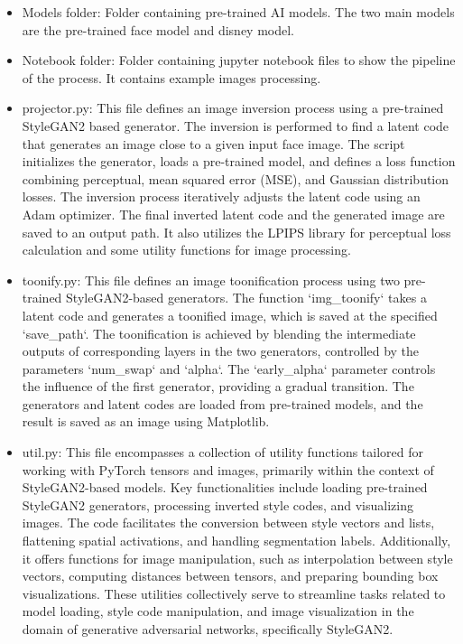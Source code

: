 \documentclass[conference]{IEEEtran}
\begin{document}
\begin{itemize}
                \vspace{3mm}
                \item Models folder: Folder containing pre-trained AI models. The two main models are the pre-trained face model and disney model.\\
                \item Notebook folder: Folder containing jupyter notebook files to show the pipeline of the process. It contains example images processing.\\
                \vspace{3mm}
                \item projector.py: This file defines an image inversion process using a pre-trained StyleGAN2 based generator. The inversion is performed to find a latent code that generates an image close to a given input face image. The script initializes the generator, loads a pre-trained model, and defines a loss function combining perceptual, mean squared error (MSE), and Gaussian distribution losses. The inversion process iteratively adjusts the latent code using an Adam optimizer. The final inverted latent code and the generated image are saved to an output path. It also utilizes the LPIPS library for perceptual loss calculation and some utility functions for image processing. \\
                \vspace{3mm}
                \item toonify.py: This file defines an image toonification process using two pre-trained StyleGAN2-based generators. The function `img\_toonify` takes a latent code and generates a toonified image, which is saved at the specified `save\_path`. The toonification is achieved by blending the intermediate outputs of corresponding layers in the two generators, controlled by the parameters `num\_swap` and `alpha`. The `early\_alpha` parameter controls the influence of the first generator, providing a gradual transition. The generators and latent codes are loaded from pre-trained models, and the result is saved as an image using Matplotlib.\\
                \vspace{3mm}
                \item util.py: This file encompasses a collection of utility functions tailored for working with PyTorch tensors and images, primarily within the context of StyleGAN2-based models. Key functionalities include loading pre-trained StyleGAN2 generators, processing inverted style codes, and visualizing images. The code facilitates the conversion between style vectors and lists, flattening spatial activations, and handling segmentation labels. Additionally, it offers functions for image manipulation, such as interpolation between style vectors, computing distances between tensors, and preparing bounding box visualizations. These utilities collectively serve to streamline tasks related to model loading, style code manipulation, and image visualization in the domain of generative adversarial networks, specifically StyleGAN2.\\

\end{itemize}
\end{document}
